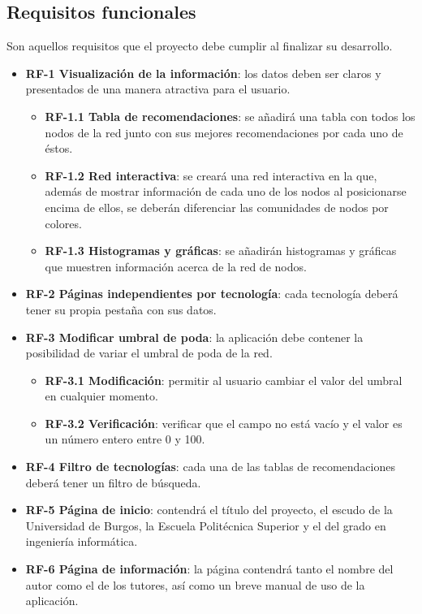 \subsection{Requisitos funcionales}
Son aquellos requisitos que el proyecto debe cumplir al finalizar su desarrollo.


  \begin{itemize}  
    \item \textbf{RF-1 Visualización de la información}: los datos deben ser claros y presentados de una manera atractiva para el usuario.
    \begin{itemize}
        \item \textbf{RF-1.1 Tabla de recomendaciones}: se añadirá una tabla con todos los nodos de la red junto con sus mejores recomendaciones por cada uno de éstos.
        \item \textbf{RF-1.2 Red interactiva}: se creará una red interactiva en la que, además de mostrar información de cada uno de los nodos al posicionarse encima de ellos, se deberán diferenciar las comunidades de nodos por colores.
        \item \textbf{RF-1.3 Histogramas y gráficas}: se añadirán histogramas y gráficas que muestren información acerca de la red de nodos.
    \end{itemize}
    
    \item \textbf{RF-2 Páginas independientes por tecnología}: cada tecnología deberá tener su propia pestaña con sus datos.
    
    \item \textbf{RF-3 Modificar umbral de poda}: la aplicación debe contener la posibilidad de variar el umbral de poda de la red.
    \begin{itemize}
        \item \textbf{RF-3.1 Modificación}: permitir al usuario cambiar el valor del umbral en cualquier momento.
        \item \textbf{RF-3.2 Verificación}: verificar que el campo no está vacío y el valor es un número entero entre 0 y 100.
    \end{itemize}
    
    \item \textbf{RF-4 Filtro de tecnologías}: cada una de las tablas de recomendaciones deberá tener un filtro de búsqueda.
    
    \item \textbf{RF-5 Página de inicio}: contendrá el título del proyecto, el escudo de la Universidad de Burgos, la Escuela Politécnica Superior y el del grado en ingeniería informática.
    
    \item \textbf{RF-6 Página de información}: la página contendrá tanto el nombre del autor como el de los tutores, así como un breve manual
    de uso de la aplicación.
    
\end{itemize}

